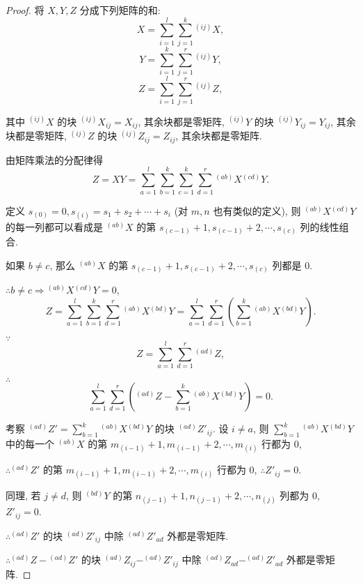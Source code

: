 \documentclass[color=black,device=normal,lang=cn,mode=geye]{elegantnote}
\begin{document}
\begin{proof}
    将 $X,Y,Z$ 分成下列矩阵的和:
    \[X=\sum\limits_{i=1}^{l}\sum\limits_{j=1}^{k}{}^{(ij)}X,\]
    \[Y=\sum\limits_{i=1}^{k}\sum\limits_{j=1}^{r}{}^{(ij)}Y,\]
    \[Z=\sum\limits_{i=1}^{l}\sum\limits_{j=1}^{r}{}^{(ij)}Z,\]

    其中 ${}^{(ij)}X$ 的块 ${}^{(ij)}X_{ij}=X_{ij}$, 其余块都是零矩阵, ${}^{(ij)}Y$ 的块 ${}^{(ij)}Y_{ij}=Y_{ij}$, 其余块都是零矩阵, ${}^{(ij)}Z$ 的块 ${}^{(ij)}Z_{ij}=Z_{ij}$, 其余块都是零矩阵.

    由矩阵乘法的分配律得
    \[Z=XY=\sum\limits_{a=1}^{l}\sum\limits_{b=1}^{k}\sum\limits_{c=1}^{k}\sum\limits_{d=1}^{r}{}^{(ab)}X{}^{(cd)}Y.\]

    定义 $s_{(0)}=0,s_{(i)}=s_1+s_2+\cdots+s_i$ (对 $m,n$ 也有类似的定义), 则 ${}^{(ab)}X{}^{(cd)}Y$ 的每一列都可以看成是 ${}^{(ab)}X$ 的第 $s_{(c-1)}+1,s_{(c-1)}+2,\cdots,s_{(c)}$ 列的线性组合.

    如果 $b\neq c$, 那么 ${}^{(ab)}X$ 的第 $s_{(c-1)}+1,s_{(c-1)}+2,\cdots,s_{(c)}$ 列都是 $0$.

    $\therefore b\neq c\Rightarrow{}^{(ab)}X{}^{(cd)}Y=0$,
    \[Z=\sum\limits_{a=1}^{l}\sum\limits_{b=1}^{k}\sum\limits_{d=1}^{r}{}^{(ab)}X{}^{(bd)}Y=\sum\limits_{a=1}^{l}\sum\limits_{d=1}^{r}\left(\sum\limits_{b=1}^{k}{}^{(ab)}X{}^{(bd)}Y\right).\]

    $\because$
    \[Z=\sum\limits_{a=1}^{l}\sum\limits_{d=1}^{r}{}^{(ad)}Z,\]

    $\therefore$
    \begin{equation}\label{eq2.5}
        \sum\limits_{a=1}^{l}\sum\limits_{d=1}^{r}\left({}^{(ad)}Z-\sum\limits_{b=1}^{k}{}^{(ab)}X{}^{(bd)}Y\right)=0.
    \end{equation}

    考察 $^{(ad)}Z'=\sum\limits_{b=1}^{k}{}^{(ab)}X{}^{(bd)}Y$ 的块 $^{(ad)}Z'_{ij}$. 设 $i\neq a$, 则 $\sum\limits_{b=1}^{k}{}^{(ab)}X{}^{(bd)}Y$ 中的每一个 $^{(ab)}X$ 的第 $m_{(i-1)}+1,m_{(i-1)}+2,\cdots,m_{(i)}$ 行都为 $0$,

    $\therefore{}^{(ad)}Z'$ 的第 $m_{(i-1)}+1,m_{(i-1)}+2,\cdots,m_{(i)}$ 行都为 $0$, $\therefore Z'_{ij}=0$.

    同理, 若 $j\neq d$, 则 $^{(bd)}Y$ 的第 $n_{(j-1)}+1,n_{(j-1)}+2,\cdots,n_{(j)}$ 列都为 $0$, $Z'_{ij}=0$.

    $\therefore{}^{(ad)}Z'$ 的块 $^{(ad)}Z'_{ij}$ 中除 $^{(ad)}Z'_{ad}$ 外都是零矩阵.

    $\therefore{}^{(ad)}Z-{}^{(ad)}Z'$ 的块 $^{(ad)}Z_{ij}-^{(ad)}Z'_{ij}$ 中除 $^{(ad)}Z_{ad}-^{(ad)}Z'_{ad}$ 外都是零矩阵.


\end{proof}
\end{document}
